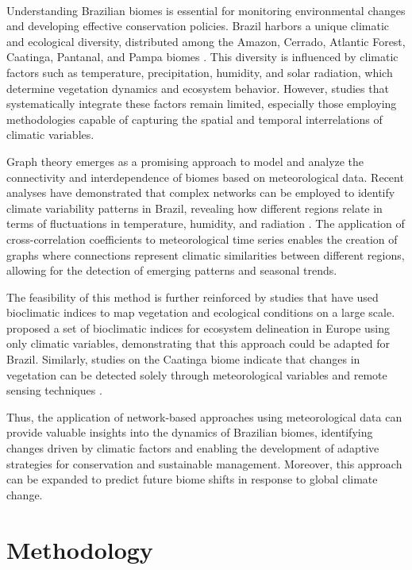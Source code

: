 \documentclass[conference]{IEEEtran}
\begin{document}
\

Understanding Brazilian biomes is essential for monitoring environmental changes and developing effective conservation policies. Brazil harbors a unique climatic and ecological diversity, distributed among the Amazon, Cerrado, Atlantic Forest, Caatinga, Pantanal, and Pampa biomes \cite{penereiro2018seasonal}. This diversity is influenced by climatic factors such as temperature, precipitation, humidity, and solar radiation, which determine vegetation dynamics and ecosystem behavior. However, studies that systematically integrate these factors remain limited, especially those employing methodologies capable of capturing the spatial and temporal interrelations of climatic variables.

Graph theory emerges as a promising approach to model and analyze the connectivity and interdependence of biomes based on meteorological data. Recent analyses have demonstrated that complex networks can be employed to identify climate variability patterns in Brazil, revealing how different regions relate in terms of fluctuations in temperature, humidity, and radiation \cite{oliveira2023networks}. The application of cross-correlation coefficients to meteorological time series enables the creation of graphs where connections represent climatic similarities between different regions, allowing for the detection of emerging patterns and seasonal trends.

The feasibility of this method is further reinforced by studies that have used bioclimatic indices to map vegetation and ecological conditions on a large scale. \cite{caudullo2014geospatial} proposed a set of bioclimatic indices for ecosystem delineation in Europe using only climatic variables, demonstrating that this approach could be adapted for Brazil. Similarly, studies on the Caatinga biome indicate that changes in vegetation can be detected solely through meteorological variables and remote sensing techniques \cite{ganem2020mapping,silva2022mapping}.

Thus, the application of network-based approaches using meteorological data can provide valuable insights into the dynamics of Brazilian biomes, identifying changes driven by climatic factors and enabling the development of adaptive strategies for conservation and sustainable management. Moreover, this approach can be expanded to predict future biome shifts in response to global climate change.
\section{Methodology}
\end{document}
